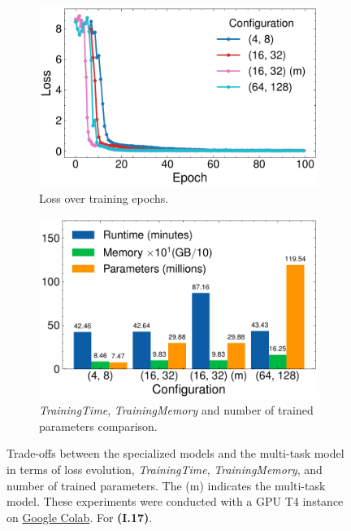 \documentclass{article}
\begin{document}
\begin{figure}[h]
    \centering
    \begin{subfigure}{0.45\textwidth}
        \includegraphics[width=0.9\linewidth]{../images/I.17 Results_loss.pdf}
        \caption{Loss over training epochs. \vspace{3.5mm}}
    \end{subfigure}
    \hfill
    \begin{subfigure}{0.45\textwidth}
        \includegraphics[width=0.9\linewidth]{../images/I.17 Results_metrics.pdf}
        \caption{\emph{TrainingTime}, \emph{TrainingMemory} and number of trained parameters comparison.}
    \end{subfigure}
    \caption{Trade-offs between the specialized models and the multi-task model in terms of loss evolution, \emph{TrainingTime}, \emph{TrainingMemory}, and number of trained parameters. The (m) indicates the multi-task model. These experiments were conducted with a GPU T4 instance on \href{https://colab.research.google.com/}{Google Colab}. For \textbf{(I.17)}.}
    \label{fig:I.17-results}
\end{figure}
\end{document}
